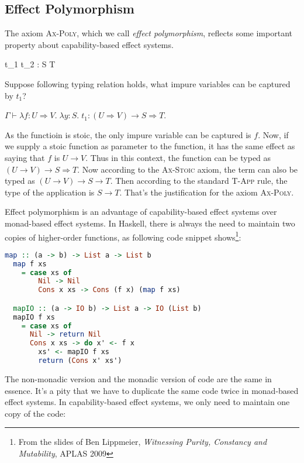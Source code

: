 \subsection{Effect Polymorphism}

The axiom \textsc{Ax-Poly}, which we call \emph{effect polymorphism},
reflects some important property about capability-based effect
systems.

 { \Gamma \vdash t_1 \;
  t_2 : S \to T }


Suppose following typing relation holds, what impure
variables can be captured by $t_1$?

\begin{center}
  $\Gamma \vdash \lambda f:U \Rightarrow V. \; \lambda y:S. \; t_1 : (U
  \Rightarrow V) \to S \Rightarrow T$.
\end{center}

As the functioin is stoic, the only impure variable can be captured is
$f$. Now, if we supply a stoic function as parameter to the function,
it has the same effect as saying that $f$ is $U \to V$. Thus in this
context, the function can be typed as $(U \to V) \to S \Rightarrow T$.
Now according to the \textsc{Ax-Stoic} axiom, the term can also be
typed as $(U \to V) \to S \to T$. Then according to the standard
\textsc{T-App} rule, the type of the application is $S \to T$. That's
the justification for the axiom \textsc{Ax-Poly}.

Effect polymorphism is an advantage of capability-based effect systems
over monad-based effect systems. In Haskell, there is always the need
to maintain two copies of higher-order functions, as following code
snippet shows\footnote{From the slides of Ben Lippmeier,
  \emph{Witnessing Purity, Constancy and Mutability}, APLAS 2009}:

\begin{lstlisting}[language=Haskell]
  map :: (a -> b) -> List a -> List b
  map f xs
    = case xs of
        Nil -> Nil
        Cons x xs -> Cons (f x) (map f xs)

  mapIO :: (a -> IO b) -> List a -> IO (List b)
  mapIO f xs
    = case xs of
      Nil -> return Nil
      Cons x xs -> do x' <- f x
        xs' <- mapIO f xs
        return (Cons x' xs')
\end{lstlisting}

The non-monadic version and the monadic version of code are the same
in essence. It's a pity that we have to duplicate the same code twice
in monad-based effect systems. In capability-based effect systems, we
only need to maintain one copy of the code:


